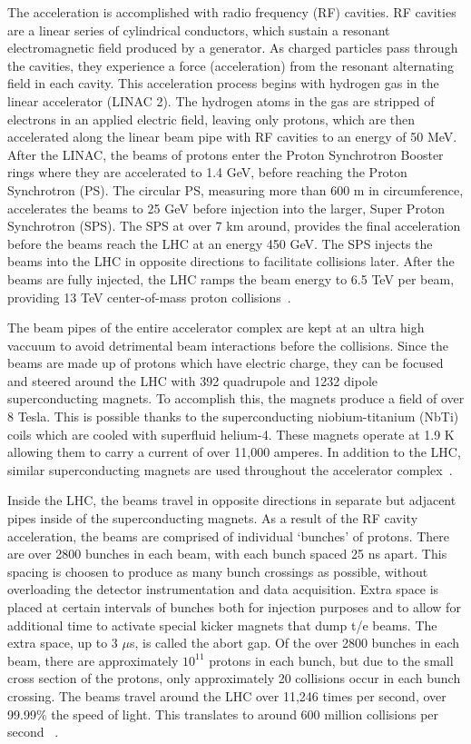 The acceleration is accomplished with radio frequency (RF) cavities. RF cavities are a linear series of cylindrical conductors,
which sustain a resonant electromagnetic field produced by a generator. As 
charged particles pass through the cavities, they experience a force
(acceleration) from the resonant alternating field in each cavity. This acceleration process begins with hydrogen gas in the linear accelerator
(LINAC 2). The hydrogen atoms in the gas are stripped of electrons
in an applied electric field, leaving only protons, which are then accelerated
along the linear beam pipe with RF cavities to an energy of 50 MeV. After the LINAC, the beams of protons enter the Proton Synchrotron Booster rings where
they are accelerated to 1.4 GeV, before reaching the Proton
Synchrotron (PS). The circular PS, measuring more than 600 m
in circumference, accelerates the beams to 25 GeV before injection into the
larger, Super Proton Synchrotron (SPS). The SPS at over 7 km around, provides the final
acceleration before the beams reach the LHC at an energy 450 GeV. The SPS injects the beams into
the LHC in opposite directions to facilitate collisions later. After the beams are fully injected, the LHC ramps the beam energy to 6.5 TeV per beam, providing 13 TeV center-of-mass proton collisions~\cite{lhc_bluebook}.

The beam pipes of the entire accelerator complex are kept at an ultra high vaccuum
to avoid detrimental beam interactions before the collisions. Since the beams are made up of protons which have electric charge,
they can be focused and steered around the LHC with 392 quadrupole and 1232 dipole superconducting magnets.
To accomplish this, the magnets produce a field of over 8 Tesla. This is possible thanks to the
superconducting niobium-titanium (NbTi) coils which are cooled with superfluid helium-4. These
magnets operate at 1.9 K allowing them to carry a current of over 11,000 amperes. In addition to
the LHC, similar superconducting magnets are used throughout the accelerator complex~\cite{lhc_bluebook}.

Inside the LHC, the beams travel in opposite directions in separate but adjacent pipes inside of the superconducting magnets.
As a result of the RF cavity acceleration, the beams are comprised of individual `bunches' of protons.
There are over 2800 bunches in each beam, with each bunch spaced 25 ns apart. This spacing is choosen to
produce as many bunch crossings as possible, without overloading
the detector instrumentation and data acquisition. Extra space is placed at certain intervals of bunches
both for injection purposes and to allow for additional time to activate special kicker magnets that dump t/e beams. The extra space, up to 3 $\mu$s, is 
called the abort gap. Of the over 2800 bunches in each beam, there are approximately $10^{11}$ protons in each bunch, but due to the small cross section of the protons,
only approximately 20 collisions occur in each bunch crossing. The beams travel around the LHC over 11,246 times per second, over 99.99$\%$ the speed of light. 
This translates to around 600 million collisions per second ~\cite{lhc_bluebook}.

